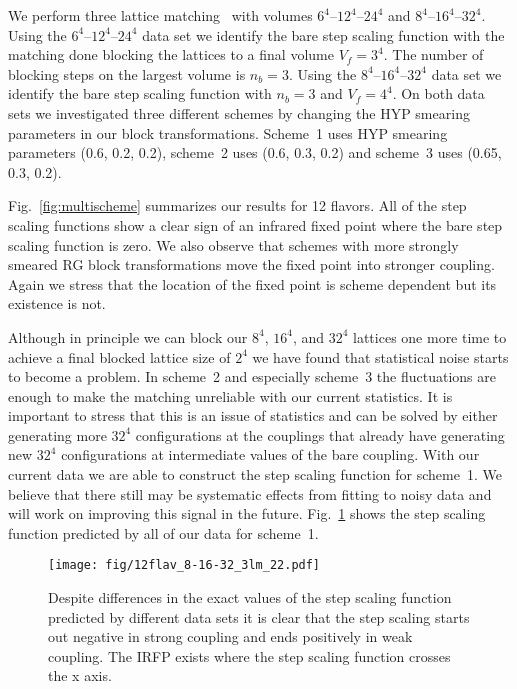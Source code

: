 \documentclass{PoS}
\newcommand{\fig}[1]{Fig.~\ref{#1}}
\newcommand{\TODO}[1]{\textcolor{red}{{\bf #1}}}
\begin{document}
We perform three lattice matching~\TODO{\cite{}} with volumes $6^4$--$12^4$--$24^4$ and $8^4$--$16^4$--$32^4$.
Using the $6^4$--$12^4$--$24^4$ data set we identify the bare step scaling function with the matching done blocking the lattices to a final volume $V_f = 3^4$.
The number of blocking steps on the largest volume is $n_b = 3$.
Using the $8^4$--$16^4$--$32^4$ data set we identify the bare step scaling function with $n_b = 3$ and $V_f = 4^4$.
On both data sets we investigated three different schemes by changing the HYP smearing parameters in our block transformations.
Scheme~1 uses HYP smearing parameters (0.6, 0.2, 0.2), scheme~2 uses (0.6, 0.3, 0.2) and scheme~3 uses (0.65, 0.3, 0.2).

\fig{fig:multischeme} summarizes our results for 12 flavors.
All of the step scaling functions show a clear sign of an infrared fixed point where the bare step scaling function is zero.
We also observe that schemes with more strongly smeared RG block transformations move the fixed point into stronger coupling.
Again we stress that the location of the fixed point is scheme dependent but its existence is not.

Although in principle we can block our $8^4$, $16^4$, and $32^4$ lattices one more time to achieve a final blocked lattice size of $2^4$ we have found that statistical noise starts to become a problem.
In scheme~2 and especially scheme~3 the fluctuations are enough to make the matching unreliable with our current statistics.
It is important to stress that this is an issue of statistics and can be solved by either generating more $32^4$ configurations at the couplings that already have generating new $32^4$ configurations at intermediate values of the bare coupling.
With our current data we are able to construct the step scaling function for scheme~1.
We believe that there still may be systematic effects from fitting to noisy data and will work on improving this signal in the future.
\fig{fig:scheme7} shows the step scaling function predicted by all of our data for scheme~1.

\begin{figure}[th]
  \centering
  \texttt{[image: fig/12flav\_8-16-32\_3lm\_22.pdf]}
  \caption{Despite differences in the exact values of the step scaling function predicted by different data sets it is clear that the step scaling starts out negative in strong coupling and ends positively in weak coupling.  The IRFP exists where the step scaling function crosses the x axis.}
  \label{fig:scheme7}
\end{figure}
\end{document}
